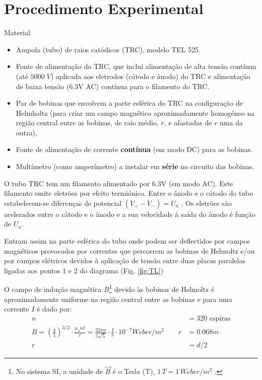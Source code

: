 \documentclass[a4paper,twoside,12pt]{article}      %
\begin{document}
\section{\sf Procedimento Experimental}
{ \large Material }
\begin{itemize}
	\item Ampola (tubo) de raios catódicos (TRC), modelo TEL 525.
	\item 	Fonte de alimentação do TRC, que inclui alimentação de alta tensão contínua 
	(até $5000\;V$) aplicada aos eletrodos (cátodo e ânodo) do TRC e alimentação de baixa tensão
	(6.3V AC) contínua para o filamento do TRC.
	\item Par de bobinas que envolvem a parte esférica do TRC na configuração de
	Helmholtz (para criar um campo magnético aproximadamente homogéneo na
	região central entre as bobinas, de raio médio, $r$, e afastadas de $r$ uma da outra).
	\item Fonte de alimentação de corrente \textbf{contínua} (em modo DC) para as bobinas.
	\item Multímetro (como amperímetro) a instalar em \textbf{série} no circuito das bobinas.
\end{itemize}

O tubo TRC tem um filamento alimentado por 6.3V (em modo AC). Este filamento emite eletrões por efeito termiónico. 
Entre o ânodo e o cátodo do tubo estabelecem-se diferenças de potencial $ (V_+ - V_-) = U_a$ . Os eletrões são acelerados entre o cátodo e o ânodo e a sua velocidade à saída do ânodo é função de $U_a$. 

Entram assim na parte esférica do tubo onde podem ser deflectidos por campos magnéticos provocados por correntes que percorrem as bobinas de Helmoltz e/ou por campos elétricos devidos à aplicação de tensão entre duas placas paralelas ligadas aos pontos 1 e 2 do diagrama (Fig. \ref{fig:TL})

O campo de indução magnética $B$\footnote{No sistema SI, a unidade de $\vec{B}$ é o Tesla (T), $1\,T=1\,Weber/m^{2}$ .}  devido às bobinas de Helmoltz é aproximadamente uniforme na região central entre as bobinas e para uma corrente $I$ é dado por:
\begin{align}
	\label{eq:helmotz}
	 n &= 320\textrm{ espiras} \nonumber \\ 
B = \left(\frac{4}{5}\right)^{3/2} \cdot \frac{\mu_0 n I}{r} =  \frac{32 \pi n }{5 \sqrt{5}} \cdot \frac{I}{r} \cdot 10^{-7} Weber/m^{2}
 \qquad  r  &= 0.068 m \\
r  &= d/2 \nonumber
\end{align}
\end{document}
